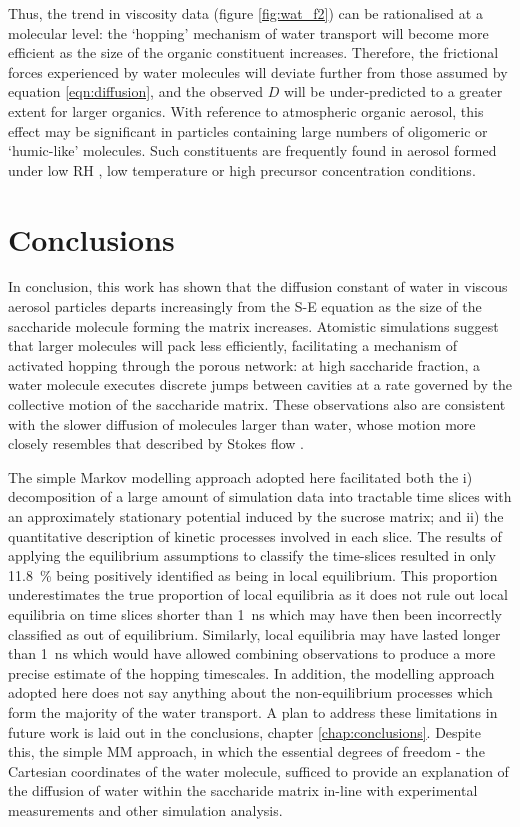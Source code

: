 Thus, the trend in viscosity data (figure \ref{fig:wat_f2}) can be rationalised at a molecular level: the `hopping’ mechanism of water transport will become more efficient as the size of the organic constituent increases. Therefore, the frictional forces experienced by water molecules will deviate further from those assumed by equation \ref{eqn:diffusion}, and the observed $D$ will be under-predicted to a greater extent for larger organics. With reference to atmospheric organic aerosol, this effect may be significant in particles containing large numbers of oligomeric or `humic-like’ molecules. Such constituents are frequently found in aerosol formed under low RH \cite{Jia2018}, low temperature \cite{huang2018alpha} or high precursor concentration \cite{Kourtchev2016} conditions.

\section{Conclusions}\label{sec:wat_conclusions}
In conclusion, this work has shown that the diffusion constant of water in viscous aerosol particles departs increasingly from the S-E equation as the size of the saccharide molecule forming the matrix increases. Atomistic simulations suggest that larger molecules will pack less efficiently, facilitating a mechanism of activated hopping through the porous network: at high saccharide fraction, a water molecule executes discrete jumps between cavities at a rate governed by the collective motion of the saccharide matrix. These observations also are consistent with the slower diffusion of molecules larger than water, whose motion more closely resembles that described by Stokes flow \cite{Gonzalez2015}.

The simple Markov modelling approach adopted here facilitated both the i) decomposition of a large amount of simulation data into tractable time slices with an approximately stationary potential induced by the sucrose matrix; and ii) the quantitative description of kinetic processes involved in each slice. The results of applying the equilibrium assumptions to classify the time-slices resulted in only \SI{11.8}{\percent} being positively identified as being in local equilibrium. This proportion underestimates the true proportion of local equilibria as it does not rule out local equilibria on time slices shorter than \SI{1}{\nano\second} which may have then been incorrectly classified as out of equilibrium. Similarly, local equilibria may have lasted longer than \SI{1}{\nano\second} which would have allowed combining observations to produce a more precise estimate of the hopping timescales. In addition, the modelling approach adopted here does not say anything about the non-equilibrium processes which form the majority of the water transport. A plan to address these limitations in future work is laid out in the conclusions, chapter \ref{chap:conclusions}. Despite this, the simple MM approach, in which the essential degrees of freedom - the Cartesian coordinates of the water molecule, sufficed to provide an explanation of the diffusion of water within the saccharide matrix in-line with experimental measurements and other simulation analysis. 



